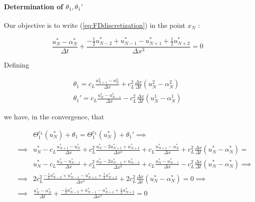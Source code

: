 \paragraph{Determination of $\theta_1, \theta_1'$}

\indent Our objective is to write (\ref{eq:FDdiscretization}) in the point $x_{N}$ :

\begin{equation}
    \label{eq:FDdiscretizationN}
    \frac{u_{N}^* - \alpha_{N}^*}{\Delta t} + \frac{-\frac{1}{2}u_{N-2}^* + u_{N-1}^* - u_{N+1}^* + \frac{1}{2}u_{N+2}^* }{\Delta x ^3} = 0
\end{equation}

\indent Defining 

\begin{gather}
    \theta_1 = c_L \frac{u_{N+1}^2 - u_{N}^2}{\Delta x} + c_L^2\frac{\Delta x}{\Delta t} \left( u_{N}^2 - \alpha_{N}^2 \right)\\
    \theta_1' = c_L \frac{u_{N}^1 - u_{N-1}^1}{\Delta x} - c_L^2\frac{\Delta x}{\Delta t} \left( u_{N}^1 - \alpha_{N}^1 \right)
\end{gather}

\indent we have, in the convergence, that

\begin{equation}
\label{eq:modifiedTBC1}
\begin{aligned}
&& &    \Theta_1^{c_L}(u_N^*) + \theta_1 = \Theta_1^{c_L}(u_N^*) + \theta_1'\implies \\
&& \implies &    u_N^* - c_L \frac{u_{N+1}^* - u_N^*}{\Delta x} + c_L^2\frac{u_N^* - 2u_{N+1}^* + u_{N+2}^*}{\Delta x^2} + c_L \frac{u_{N+1}^* - u_{N}^*}{\Delta x} + c_L^2\frac{\Delta x}{\Delta t} \left( u_{N}^* - \alpha_{N}^* \right) = \\
&& & u_N^* - c_L \frac{u_{N}^* - u_{N-1}^*}{\Delta x} + c_L^2\frac{u_N^* - 2u_{N-1}^* + u_{N-2}^*}{\Delta x^2} + c_L \frac{u_{N}^* - u_{N-1}^*}{\Delta x} - c_L^2\frac{\Delta x}{\Delta t} \left( u_{N}^* - \alpha_{N}^* \right) \implies \\
 && \implies &    2c_L^2 \frac{-\frac{1}{2}u_{N-2}^* + u_{N-1}^* - u_{N+1}^* + \frac{1}{2}u_{N+2}^* }{\Delta x ^2}  +             2c_L^2\frac{\Delta x}{\Delta t} \left( u_{N}^* - \alpha_{N}^* \right) = 0 \implies \\
&& \implies &    \frac{u_{N}^* - \alpha_{N}^*}{\Delta t} + \frac{-\frac{1}{2}u_{N-2}^* + u_{N-1}^* - u_{N+1}^* + \frac{1}{2}u_{N+2}^* }{\Delta x ^3} = 0
\end{aligned}
\end{equation}

